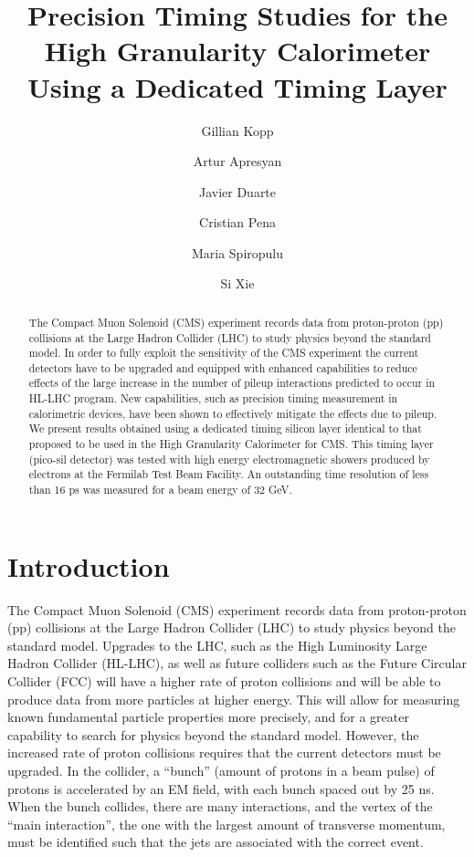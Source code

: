 \documentclass[twocolumn,aps,prd,reprint]{revtex4-1}
\begin{document}
\graphicspath{{GillianKopp/}}

\title{Precision Timing Studies for the High Granularity Calorimeter Using a Dedicated Timing Layer}
\author{Gillian Kopp}
\author{Artur Apresyan}
\author{Javier Duarte}
\author{Cristian Pena}
\author{Maria Spiropulu}
\author{Si Xie}

\begin{abstract}
The Compact Muon Solenoid (CMS) experiment records data from proton-proton (pp) collisions at the Large Hadron Collider (LHC) to study physics beyond the standard model. In order to fully exploit the sensitivity of the CMS experiment the current detectors have to be upgraded and equipped with enhanced capabilities to reduce effects of the large increase in the number of pileup interactions predicted to occur in HL-LHC program. New capabilities, such as precision timing measurement in calorimetric devices, have been shown to effectively mitigate the effects due to pileup. We present results obtained using a dedicated timing silicon layer identical to that proposed to be used in the High Granularity Calorimeter for CMS. This timing layer (pico-sil detector) was tested with high energy electromagnetic showers produced by electrons at the Fermilab Test Beam Facility. An outstanding time resolution of less than 16 ps was measured for a beam energy of 32 GeV.
\end{abstract}

\maketitle
\section{Introduction}


The Compact Muon Solenoid (CMS) experiment records data from proton-proton (pp) collisions at the Large Hadron Collider (LHC) to study physics beyond the standard model. Upgrades to the LHC, such as the High Luminosity Large Hadron Collider (HL-LHC), as well as future colliders such as the Future Circular Collider (FCC) will have a higher rate of proton collisions and will be able to produce data from more particles at higher energy. This will allow for measuring known fundamental particle properties more precisely, and for a greater capability to search for physics beyond the standard model. However, the increased rate of proton collisions requires that the current detectors must be upgraded. In the collider, a ``bunch'' (amount of protons in a beam pulse) of protons is accelerated by an EM field, with each bunch spaced out by 25 ns. When the bunch collides, there are many interactions, and the vertex of the ``main interaction'', the one with the largest amount of transverse momentum, must be identified such that the jets are associated with the correct event.
\end{document}
